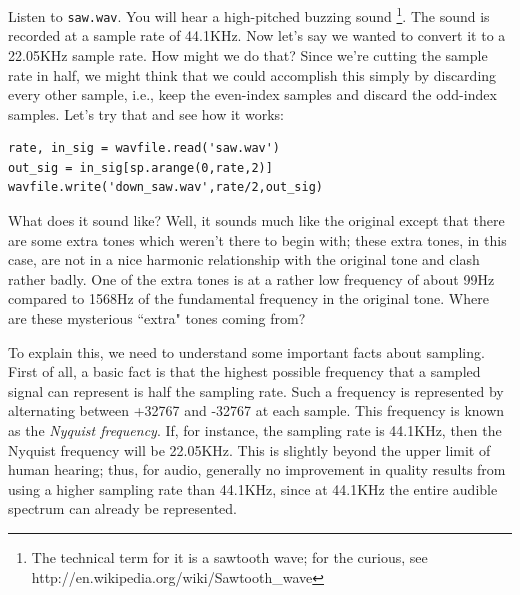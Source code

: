 Listen to \texttt{saw.wav}. You will hear a high-pitched buzzing sound \footnote{The technical term for it is a sawtooth wave; for the curious, see http://en.wikipedia.org/wiki/Sawtooth\_wave}. The sound is recorded at a sample rate of 44.1KHz. Now let's say we wanted to convert it to a 22.05KHz sample rate. How might we do that? Since we're cutting the sample rate in half, we might think that we could accomplish this simply by discarding every other sample, i.e., keep the even-index samples and discard the odd-index samples. Let's try that and see how it works:
\begin{lstlisting}
rate, in_sig = wavfile.read('saw.wav')
out_sig = in_sig[sp.arange(0,rate,2)]
wavfile.write('down_saw.wav',rate/2,out_sig)
\end{lstlisting}
What does it sound like? Well, it sounds much like the original except that there are some extra tones which weren't there to begin with; these extra tones, in this case, are not in a nice harmonic relationship with the original tone and clash rather badly. One of the extra tones is at a rather low frequency of about 99Hz compared to 1568Hz of the fundamental frequency in the original tone. Where are these mysterious ``extra" tones coming from?

To explain this, we need to understand some important facts about sampling. First of all, a basic fact is that the highest possible frequency that a sampled signal can represent is half the sampling rate. Such a frequency is represented by alternating between +32767 and -32767 at each sample. This frequency is known as the \emph{Nyquist frequency}. If, for instance, the sampling rate is 44.1KHz, then the Nyquist frequency will be 22.05KHz. This is slightly beyond the upper limit of human hearing; thus, for audio, generally no improvement in quality results from using a higher sampling rate than 44.1KHz, since at 44.1KHz the entire audible spectrum can already be represented.

